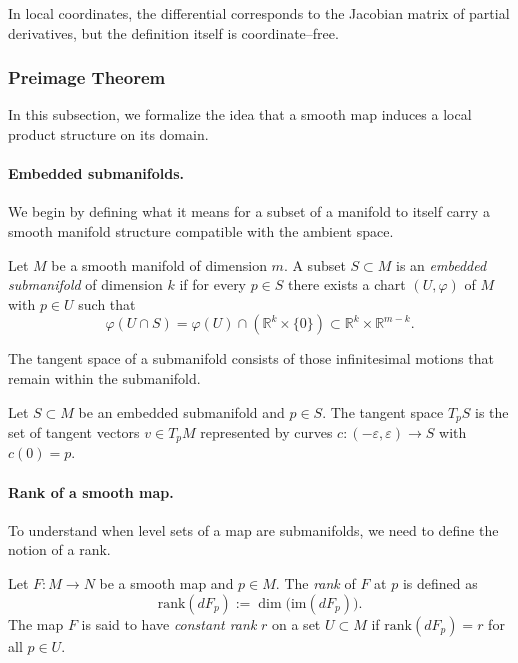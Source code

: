 In local coordinates, the differential corresponds to the Jacobian matrix of partial
derivatives, but the definition itself is coordinate--free.

\subsubsection{Preimage Theorem}
\label{subsec:background_level_sets}

In this subsection, we formalize the idea that a smooth map induces a local product
structure on its domain.

\paragraph{Embedded submanifolds.}
We begin by defining what it means for a subset of a manifold to itself carry a smooth
manifold structure compatible with the ambient space.

\begin{gdefn}
Let $M$ be a smooth manifold of dimension $m$.
A subset $S\subset M$ is an \emph{embedded submanifold} of dimension $k$ if for every
$p\in S$ there exists a chart $(U,\varphi)$ of $M$ with $p\in U$ such that
\[
\varphi(U\cap S)
=
\varphi(U)\cap (\mathbb{R}^k\times\{0\})
\subset \mathbb{R}^k\times\mathbb{R}^{m-k}.
\]
\end{gdefn}


The tangent space of a submanifold consists of those infinitesimal motions that remain
within the submanifold.

\begin{gdefn}
Let $S\subset M$ be an embedded submanifold and $p\in S$.
The tangent space $T_pS$ is the set of tangent vectors $v\in T_pM$ represented by curves
$c:(-\varepsilon,\varepsilon)\to S$ with $c(0)=p$.
\end{gdefn}

\paragraph{Rank of a smooth map.}
To understand when level sets of a map are submanifolds, we need to define the notion of a rank.

\begin{gdefn}
Let $F:M\to N$ be a smooth map and $p\in M$.
The \emph{rank} of $F$ at $p$ is defined as
\[
\mathrm{rank}(dF_p) := \dim\bigl(\mathrm{im}(dF_p)\bigr).
\]
The map $F$ is said to have \emph{constant rank} $r$ on a set $U\subset M$ if
$\mathrm{rank}(dF_p)=r$ for all $p\in U$.
\end{gdefn}

